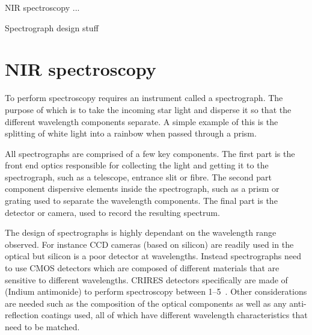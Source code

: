 
NIR spectroscopy ...

Spectrograph design stuff


\section{NIR spectroscopy}
To perform spectroscopy requires an instrument called a spectrograph. The purpose of which is to take the incoming star light and disperse it so that the different wavelength components separate. A simple example of this is the splitting of white light into a rainbow when passed through a prism.

All spectrographs are comprised of a few key components.
The first part is the front end optics responsible for collecting the light and getting it to the spectrograph, such as a telescope, entrance slit or fibre.
The second part component dispersive elements inside the spectrograph, such as a prism or grating used to separate the wavelength components.
The final part is the detector or camera, used to record the resulting spectrum.

The design of spectrographs is highly dependant on the wavelength range observed. For instance {CCD} cameras (based on silicon) are readily used in the optical but silicon is a poor detector at \nir{} wavelengths.
Instead \nir{} spectrographs need to use CMOS detectors which are composed of different materials that are sensitive to different wavelengths.
{CRIRES} detectors specifically are made of  (Indium antimonide) to perform spectroscopy between 1--5\um{}~\cite{dorn_crires_2004}.
Other considerations are needed such as the composition of the optical components as well as any anti-reflection coatings used, all of which have different wavelength characteristics that need to be matched.

